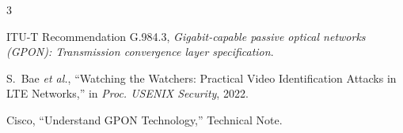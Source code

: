 \documentclass[conference]{IEEEtran}
\begin{document}


%
%
%

\begin{thebibliography}{3}

ITU-T Recommendation G.984.3, \emph{Gigabit-capable passive optical networks (GPON): Transmission convergence layer specification}.

S.~Bae \emph{et al.}, ``Watching the Watchers: Practical Video Identification Attacks in LTE Networks,'' in \emph{Proc. USENIX Security}, 2022.

Cisco, ``Understand GPON Technology,'' Technical Note.

\end{thebibliography}





\end{document}

